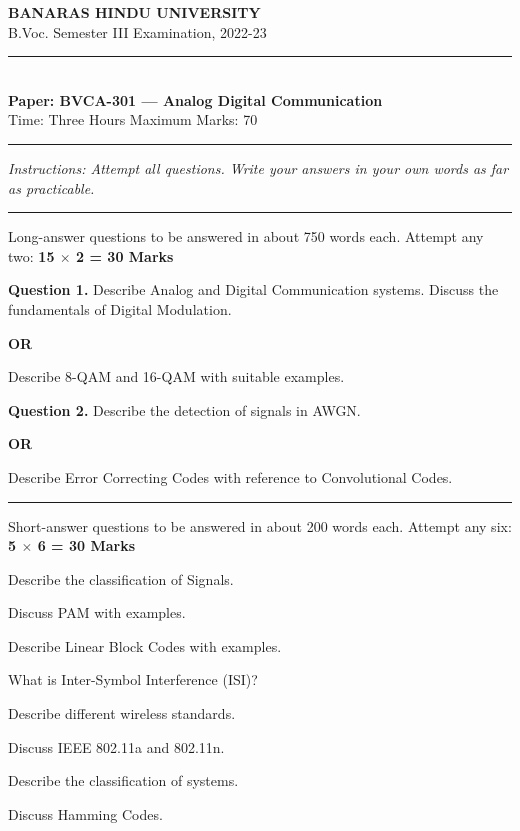 \documentclass[11pt,a4paper]{article}
\begin{document}
\begin{center}
  {\large\bfseries BANARAS HINDU UNIVERSITY}\\[2pt]
  {\normalsize B.Voc. Semester III Examination, 2022-23}\\[6pt]
  \rule{0.8\linewidth}{0.5pt}\\[6pt]
  {\large\bfseries Paper: BVCA-301 --- Analog Digital Communication}\\[4pt]
  {\normalsize Time: Three Hours \hfill Maximum Marks: 70}
\end{center}

\rule{\linewidth}{0.4pt}

\smallskip



\noindent   \textit{Instructions: Attempt all questions. Write your answers in your own words as far as practicable.}

\bigskip

\bigskip


\rule{\linewidth}{0.4pt}\smallskip

Long-answer questions to be answered in about 750 words each. Attempt any two: \hfill   \textbf{15 $ \times$ 2 = 30 Marks}

\medskip



\noindent   \textbf{Question 1.} Describe Analog and Digital Communication systems. Discuss the fundamentals of Digital Modulation.
\centerline{   \textbf{OR}}
Describe 8-QAM and 16-QAM with suitable examples.

\medskip



\noindent   \textbf{Question 2.} Describe the detection of signals in AWGN.
\centerline{   \textbf{OR}}
Describe Error Correcting Codes with reference to Convolutional Codes.

\bigskip


\rule{\linewidth}{0.4pt}\smallskip

Short-answer questions to be answered in about 200 words each. Attempt any six: \hfill   \textbf{5 $ \times$ 6 = 30 Marks}

\begin{parts}
  \item Describe the classification of Signals.
  \item Discuss PAM with examples.
  \item Describe Linear Block Codes with examples.
  \item What is Inter-Symbol Interference (ISI)?
  \item Describe different wireless standards.
  \item Discuss IEEE 802.11a and 802.11n.
  \item Describe the classification of systems.
  \item Discuss Hamming Codes.
\end{parts}
\end{document}
